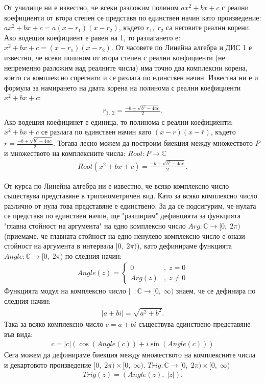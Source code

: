 \documentclass[a4paper, 12pt, oneside]{article}
\newcommand{\Complex}{\mathbb{C}}
\begin{document}
От училище ни е известно, че всеки разложим полином $ax^2 + bx + c$ с реални коефициенти от втора степен се представя по единствен начин
като произведение: $ax^2 + bx + c = a(x - r_1)(x - r_2)$, където $r_1, \; r_2$ са неговите реални корени. Ако водещия коефициент е равен на 1,
то разлагането е: $x^2 + bx + c = (x - r_1)(x - r_2)$. От часовете по Линейна алгебра и ДИС 1 е известно, че всеки полином от втора степен с реални коефициенти
(не непременно разложим над реалните числа) има точно два комплексни корена, които са комплексно спрегнати и се разлага по единствен начин.
Известна ни е и формула за намирането на двата корена на полинома с реални коефициенти $x^2 + bx + c$:
\begin{align*}
    r_{1, \; 2} = \frac{-b \pm \sqrt{b^2 - 4ac}}{2}.
\end{align*}
Ако водещия коефицинет е единица, то полинома с реални коефициенти: \\
$x^2 + bx + c$ се разлага по единствен начин като $(x - r)(x - \overline{r})$, където
$r = \frac{-b + \sqrt{b^2 - 4ac}}{2}$.
Тогава лесно можем да построим биекция между множеството $P$ и множеството на комплексните числа: $Root : P \to \Complex$
\begin{align*}
    Root(x^2 + bx + c) = \frac{-b + \sqrt{b^2 - 4ac}}{2}.
\end{align*}

От курса по Линейна алгебра ни е известно, че всяко комплексно число съществува представяне в тригонометричен вид.
Като за всяко комплексно число различно от нула това представяне е единствено. За да се подсигурим, че нулата се представя
по единствен начин, ще "разширим" дефинцията за функцията "главна стойност на аргумента" на едно комплексно число $Arg : \Complex \to [0, \; 2\pi)$
(приемаме, че главната стойност на едно ненулево комплексно число е онази стойност на аргумента в интервала $[0, \; 2\pi)$),
като дефинираме функцията $Angle : \Complex \to [0, \; 2\pi)$ по следния начин:
\begin{align*}
    Angle(z) = \begin{cases}
        0 & , \; z = 0 \\
        Arg(z) & , \; z \neq 0
    \end{cases}
\end{align*}
Функцията модул на комплексно число $|~| : \Complex \to [0, \; \infty)$ знаем, че се дефинира по следния начин:
\begin{align*}
    |a + bi| = \sqrt{a^2 + b^2}.
\end{align*}
Така за всяко комплексно число $c = a + bi$ съществува единствено представяне във вида:
\begin{align*}
    c = |c|(\cos(Angle(c)) + i\sin(Angle(c)))
\end{align*}
Сега можем да дефинираме биекция между множеството на комплексните числа и декартовото произведение
$[0, \; 2\pi) \times [0, \; \infty)$. $Trig : \Complex \to [0, \; 2\pi) \times [0, \; \infty)$
\begin{align*}
    Trig(z) = (Angle(z), \; |z|).
\end{align*}
\end{document}
